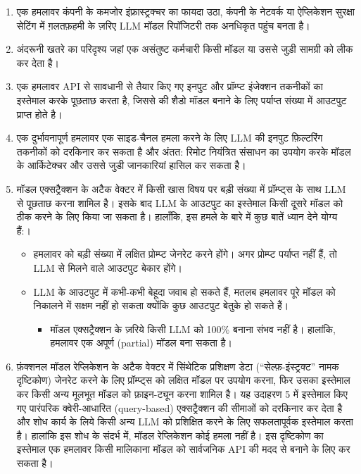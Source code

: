 \documentclass[
]{article}
\providecommand{\tightlist}{%
  \setlength{\itemsep}{0pt}\setlength{\parskip}{0pt}}
\begin{document}
\begin{enumerate}
\def\labelenumi{\arabic{enumi}.}
\tightlist
\item
  एक हमलावर कंपनी के कमजोर इंफ्रास्ट्रक्चर का फायदा उठा, कंपनी के नेटवर्क या
  ऐप्लिकेशन सुरक्षा सेटिंग में ग़लतफ़हमी के ज़रिए LLM मॉडल रिपॉजिटरी तक अनधिकृत पहुंच
  बनता है।
\item
  अंदरूनी खतरे का परिदृश्य जहां एक असंतुष्ट कर्मचारी किसी मॉडल या उससे जुड़ी सामग्री
  को लीक कर देता है।
\item
  एक हमलावर API से सावधानी से तैयार किए गए इनपुट और प्रॉम्प्ट इंजेक्शन तकनीकों का
  इस्तेमाल करके पूछताछ करता है, जिससे की शैडो मॉडल बनाने के लिए पर्याप्त संख्या में
  आउटपुट प्राप्त होते है।
\item
  एक दुर्भावनापूर्ण हमलावर एक साइड-चैनल हमला करने के लिए LLM की इनपुट फ़िल्टरिंग
  तकनीकों को दरकिनार कर सकता है और अंतत: रिमोट नियंत्रित संसाधन का उपयोग करके
  मॉडल के आर्किटेक्चर और उससे जुडी जानकारियां हासिल कर सकता है।
\item
  मॉडल एक्सट्रैक्शन के अटैक वेक्टर में किसी खास विषय पर बड़ी संख्या में प्रॉम्प्ट्स के साथ
  LLM से पूछताछ करना शामिल है। इसके बाद LLM के आउटपुट का इस्तेमाल किसी दूसरे मॉडल
  को ठीक करने के लिए किया जा सकता है। हालाँकि, इस हमले के बारे में कुछ बातें ध्यान देने
  योग्य हैं:।

  \begin{itemize}
  \tightlist
  \item
    हमलावर को बड़ी संख्या में लक्षित प्रोम्प्ट जेनरेट करने होंगे। अगर प्रोम्प्ट पर्याप्त
    नहीं हैं, तो LLM से मिलने वाले आउटपुट बेकार होंगे।
  \item
    LLM के आउटपुट में कभी-कभी बेहूदा जवाब हो सकते हैं, मतलब हमलावर पूरे मॉडल को
    निकालने में सक्षम नहीं हो सकता क्योंकि कुछ आउटपुट बेतुके हो सकते हैं।

    \begin{itemize}
    \tightlist
    \item
      मॉडल एक्सट्रैक्शन के ज़रिये किसी LLM को 100\% बनाना संभव नहीं है। हालांकि,
      हमलावर एक अपूर्ण (partial) मॉडल बना सकता है।
    \end{itemize}
  \end{itemize}
\item
  फ़ंक्शनल मॉडल रेप्लिकेशन के अटैक वेक्टर में सिंथेटिक प्रशिक्षण डेटा (``सेल्फ़-इंस्ट्रक्ट''
  नामक दृष्टिकोण) जेनरेट करने के लिए प्रॉम्प्ट्स को लक्षित मॉडल पर उपयोग करना, फिर
  उसका इस्तेमाल कर किसी अन्य मूलभूत मॉडल को फ़ाइन-ट्यून करना शामिल है। यह उदाहरण
  5 में इस्तेमाल किए गए पारंपरिक क्वेरी-आधारित (query-based) एक्सट्रैक्शन की सीमाओं
  को दरकिनार कर देता है और शोध कार्य के लिये किसी अन्य LLM को प्रशिक्षित करने के
  लिए सफलतापूर्वक इस्तेमाल करता है। हालांकि इस शोध के संदर्भ में, मॉडल रेप्लिकेशन कोई
  हमला नहीं है। इस दृष्टिकोण का इस्तेमाल एक हमलावर किसी मालिकाना मॉडल को
  सार्वजनिक API की मदद से बनाने के लिए कर सकता है।
\end{enumerate}
\end{document}
